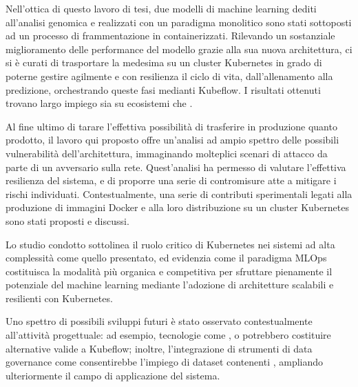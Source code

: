 Nell'ottica di questo lavoro di tesi, due modelli di machine learning dediti all'analisi genomica e realizzati con un paradigma monolitico sono stati sottoposti ad un processo di frammentazione in  containerizzati. Rilevando un sostanziale miglioramento delle performance del modello grazie alla sua nuova architettura, ci si è curati di trasportare la medesima su un cluster Kubernetes in grado di poterne gestire agilmente e con resilienza il ciclo di vita, dall'allenamento alla predizione, orchestrando queste fasi medianti Kubeflow. I risultati ottenuti trovano largo impiego sia su ecosistemi \textit{} che \textit{}.

Al fine ultimo di tarare l'effettiva possibilità di trasferire in produzione quanto prodotto, il lavoro qui proposto offre un'analisi ad ampio spettro delle possibili vulnerabilità dell'architettura, immaginando molteplici scenari di attacco da parte di un avversario sulla rete. Quest'analisi ha permesso di valutare l'effettiva resilienza del sistema, e di proporre una serie di contromisure atte a mitigare i rischi individuati. Contestualmente, una serie di contributi sperimentali legati alla produzione di immagini Docker e alla loro distribuzione su un cluster Kubernetes sono stati proposti e discussi.

Lo studio condotto sottolinea il ruolo critico di Kubernetes nei sistemi ad alta complessità come quello presentato, ed evidenzia come il paradigma MLOps costituisca la modalità più organica e competitiva per sfruttare pienamente il potenziale del machine learning mediante l'adozione di architetture scalabili e resilienti con Kubernetes.

Uno spettro di possibili sviluppi futuri è stato osservato contestualmente all'attività progettuale: ad esempio, tecnologie come ,  o  potrebbero costituire alternative valide a Kubeflow; inoltre, l'integrazione di strumenti di data governance come  consentirebbe l'impiego di dataset contenenti , ampliando ulteriormente il campo di applicazione del sistema.